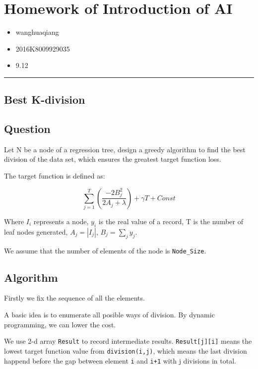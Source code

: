 \hypertarget{homework-of-introduction-of-ai}{%
\section{Homework of Introduction of
AI}\label{homework-of-introduction-of-ai}}

\begin{itemize}
\tightlist
\item
  wanghuaqiang
\item
  2016K8009929035
\item
  9.12
\end{itemize}

\begin{center}\rule{0.5\linewidth}{\linethickness}\end{center}

\hypertarget{best-k-division}{%
\subsection{Best K-division}\label{best-k-division}}

\hypertarget{question}{%
\subsection{Question}\label{question}}

Let N be a node of a regression tree, design a greedy algorithm to find
the best division of the data set, which ensures the greatest target
function loss.

The target function is defined as:

\[\sum_{j=1}^{T}(\frac{-2B_j^2}{2A_j+\lambda})+\gamma T+Const\]

Where \(I_i\) represents a node, \(y_i\) is the real value of a record,
T is the number of leaf nodes generated, \(A_j=|I_j|\),
\(B_j=\sum_{j}y_j\).

We assume that the number of elements of the node is
\texttt{Node\_Size}.

\hypertarget{algorithm}{%
\subsection{Algorithm}\label{algorithm}}

Firstly we fix the sequence of all the elements.

A basic idea is to enumerate all posible ways of division. By dynamic
programming, we can lower the cost.

We use 2-d array \texttt{Result} to record intermediate results.
\texttt{Result{[}j{]}{[}i{]}} means the lowest target function value
from \texttt{division(i,j)}, which means the last division happend
before the gap between element \texttt{i} and \texttt{i+1} with j
divisions in total.

